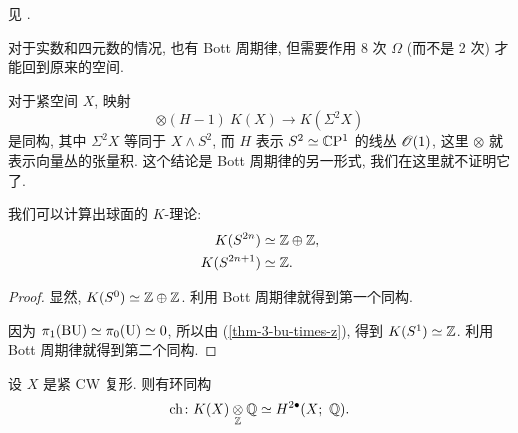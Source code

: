 见 \cite[定理~2.11]{vbkt}.

\begin{remark}
    对于实数和四元数的情况, 也有 Bott 周期律,
    但需要作用 8 次 $\Omega$ (而不是 2 次) 才能回到原来的空间. \varqed
\end{remark}

\begin{remark} \label{rmk-3-bott}
    对于紧空间 $X$, 映射
    \[ \otimes (H-1) \: K(X) \to K(\Sigma^2 X) \]
    是同构, 其中 $\Sigma^2 X$ 等同于 $X \wedge S^2$,
    而 $H$ 表示 $S^2 \simeq \mathbb{C} \mathrm{P}^1$ 的线丛 $\mathscr{O} (1)$,
    这里 $\otimes$ 就表示向量丛的张量积.
    这个结论是 Bott 周期律的另一形式, 我们在这里就不证明它了. \varqed
\end{remark}

\begin{corollary} \label{thm-3-k-sphere}
    我们可以计算出球面的 $K$-理论:
    \[ \begin{aligned}
        K(S^{2n}) & \simeq \mathbb{Z} \oplus \mathbb{Z}, \\
        K(S^{2n + 1}) & \simeq \mathbb{Z}.
    \end{aligned} \]
\end{corollary}

\begin{proof}
    显然, $K(S^0) \simeq \mathbb{Z} \oplus \mathbb{Z}$.
    利用 Bott 周期律就得到第一个同构.

    因为 $\pi_1 (\mathrm{B} \mathrm{U}) \simeq \pi_0 (\mathrm{U}) \simeq 0$,
    所以由 (\ref{thm-3-bu-times-z}), 得到 $K(S^1) \simeq \mathbb{Z}$.
    利用 Bott 周期律就得到第二个同构.
\end{proof}

\begin{theorem}
    设 $X$ 是紧 CW 复形. 则有环同构
    \[ \ch \: K(X) \underset{\bbZ}{\otimes} \bbQ \simeq H^{2\bullet}(X;\ \bbQ). \]
\end{theorem}

